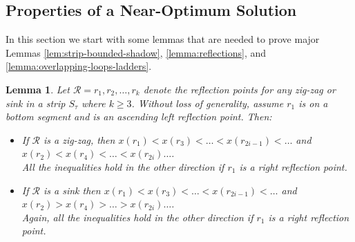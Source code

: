 \documentclass[pdflatex,sn-mathphys-num]{sn-jnl}
\theoremstyle{thmstyleone}
\newtheorem{lemma}{Lemma}
\begin{document}
\subsection{Properties of a Near-Optimum Solution}

In this section we start with some lemmas that are needed to prove major Lemmas \ref{lem:strip-bounded-shadow}, \ref{lemma:reflections}, and \ref{lemma:overlapping-loops-ladders}.
 
\begin{lemma}\label{obs:x-order}
	Let $ \mathcal R = r_1, r_2, \dots, r_k $ denote the reflection points for any zig-zag or sink in a strip $S_\tau$ where $k\geq 3$. Without loss of generality, assume $r_1$ is on a bottom segment and is an ascending left reflection point. Then:
    \begin{itemize}
        \item If $\mathcal R$ is a zig-zag, then
            $x(r_1) < x(r_3) < \dots < x(r_{2i-1})<\ldots$ and $x(r_2) < x(r_4) < \dots < x(r_{2i})\ldots$.\\
            All the inequalities hold in the other direction if $r_1$ is a right reflection point.

        
        \item If $\mathcal R$ is a sink then
            $x(r_1) < x(r_3) < \dots < x(r_{2i-1})<\ldots$ and $x(r_2) > x(r_4) > \dots > x(r_{2i})\ldots$.\\ 
            Again, all the inequalities hold in the other direction if $r_1$ is a right reflection point.  
    \end{itemize}
\end{lemma}
\end{document}
